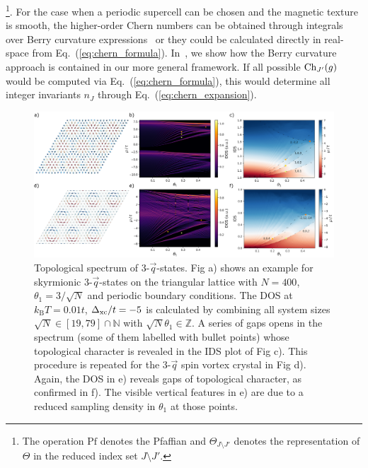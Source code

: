 \documentclass[
    10pt,
    aps,
    prr,
    twocolumn,
    floatfix,
    superscriptaddress
]{revtex4-2}
\newcommand{\SupplementalMaterial}{\cite{Note1}}
\newcommand{\revise}[1]{{\color{red} #1}}
\begin{document}
\footnote{The operation $\mathrm{Pf}$ denotes the Pfaffian and $\Theta_{J\setminus J'}$ denotes the representation of $\Theta$ in the reduced index set $J\setminus J'$.}.
For the case when a periodic supercell can be chosen and the magnetic texture is smooth, the higher-order Chern numbers can be obtained through integrals over Berry curvature expressions~\cite{Qi2008, Kraus2013, Su2020} \revise{or they could be calculated directly in real-space from Eq.~(\ref{eq:chern_formula})}.
In~\SupplementalMaterial, we show how \revise{the Berry curvature approach} is contained in our more general framework.
\revise{ If all possible ${\rm Ch}_{J'}(g)$ would be computed via Eq.~(\ref{eq:chern_formula}), this would determine all integer invariants $n_J$ through Eq.~(\ref{eq:chern_expansion}).}

\begin{figure}[t]
 \centering
 \includegraphics[width=0.85\linewidth]{../gfx/figure_02/figure_02.png}
 \caption{
     Topological spectrum of 3-$\vec{q}$-states.
     Fig a) shows an example for skyrmionic 3-$\vec{q}$-states on the triangular lattice with $N=400$, $\theta_1 = 3/\sqrt{N}$ and periodic boundary conditions.
     The DOS at $k_\mathrm{B}T = 0.01t$, $\Delta_\mathrm{xc} / t=-5$ is calculated by combining all system sizes $\sqrt{N} \in [19,79]\cap \mathbb{N}$ with  $\sqrt{N}\theta_1 \in \mathbb{Z}$.
     A series of gaps opens in the spectrum (some of them labelled with bullet points) whose topological character is revealed in the IDS plot of Fig c).
     This procedure is repeated for the 3-$\vec{q}$ spin vortex crystal in Fig d).
    Again, the DOS in e) reveals gaps of topological character, as confirmed in f).
    The visible vertical features in e) are due to a reduced sampling density in $\theta_1$ at those points. 
 }  
 \label{fig:three_q_states}
\end{figure}
\end{document}
